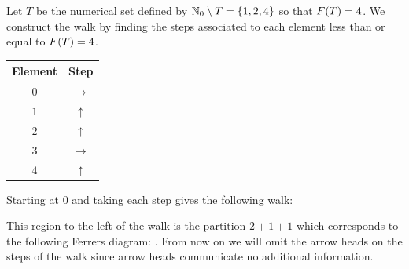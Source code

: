 \begin{examplebox}
    Let \(T\) be the numerical set defined by \(\mathbb{N}_0 \setminus T = \{1, 2, 4\}\) so that \(F(T) = 4\). We construct the walk by finding the steps associated to each element less than or equal to \(F(T) = 4\).

    \begin{center}
        \begin{tabular}{c|c}
        Element & Step \\
        \hline
        \(0\) & \(\rightarrow\)  \\
        \(1\) & \(\uparrow\) \\
        \(2\) & \(\uparrow\) \\
        \(3\) & \(\rightarrow\) \\
        \(4\) & \(\uparrow\) \\
        \end{tabular}
    \end{center}

    Starting at \(0\) and taking each step gives the following walk:
        \begin{center}
    \begin{center}
    \end{center}
    \end{center}

    This region to the left of the walk is the partition \(2 + 1 + 1\) which corresponds to the following Ferrers diagram: {\tiny {}}. From now on we will omit the arrow heads on the steps of the walk since arrow heads communicate no additional information.
\end{examplebox}

